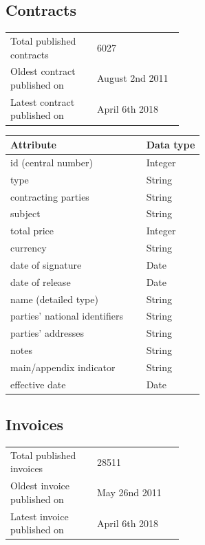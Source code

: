 \documentclass[thesis=B,english]{FITthesis}[2012/06/26]
\begin{document}
	\subsection{Contracts}
        \begin{tabular}{  p{0.5\linewidth}  l }
        \\
        Total published contracts & 6027 \\
        Oldest contract published on & August 2nd 2011\\
        Latest contract published on & April 6th 2018 \\
        \end{tabular}
        
    \begin{center}
        \begin{tabular}{  p{0.7\linewidth} | p{0.3\linewidth} }
        Attribute & Data type\\ \hline
        id (central number) & Integer \\
        type & String \\
        contracting parties & String \\
        subject & String \\
        total price & Integer \\
        currency & String \\
        date of signature & Date \\
        date of release & Date \\
        name (detailed type) & String \\
        parties' national identifiers & String \\
        parties' addresses & String \\
        notes & String \\
        main/appendix indicator & String \\
        effective date & Date \\
        \end{tabular}
    \end{center}
	\subsection{Invoices}
	\begin{tabular}{  p{0.5\linewidth}  l }
        \\
        Total published invoices & 28511 \\
        Oldest invoice published on & May 26nd 2011\\
        Latest invoice published on & April 6th 2018 \\
        \end{tabular}
        
\end{document}

